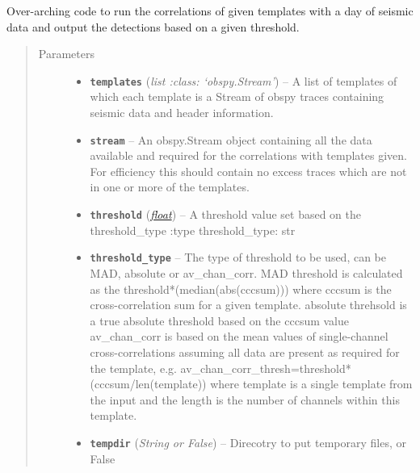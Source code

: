 \documentclass[a4paper,10pt,english]{sphinxmanual}
\begin{document}
\begin{fulllineitems}
\label{core:match_filter.match_filter}
Over-arching code to run the correlations of given templates with a day of
seismic data and output the detections based on a given threshold.
\begin{quote}\begin{description}
\item[{Parameters}] \leavevmode\begin{itemize}
\item {} 
\textbf{\texttt{templates}} (\emph{list :class: `obspy.Stream'}) -- A list of templates of which each template is a Stream of    obspy traces containing seismic data and header information.

\item {} 
\textbf{\texttt{stream}} -- An obspy.Stream object containing all the data available and    required for the correlations with templates given.  For efficiency this    should contain no excess traces which are not in one or more of the    templates.

\item {} 
\textbf{\texttt{threshold}} (\href{https://docs.python.org/library/functions.html\#float}{\emph{float}}) -- A threshold value set based on the threshold\_type    :type threshold\_type: str

\item {} 
\textbf{\texttt{threshold\_type}} -- The type of threshold to be used, can be MAD,    absolute or av\_chan\_corr.    MAD threshold is calculated as the    threshold*(median(abs(cccsum))) where cccsum is the cross-correlation sum    for a given template.    absolute threhsold is a true absolute threshold based on the cccsum value    av\_chan\_corr is based on the mean values of single-channel    cross-correlations assuming all data are present as required for the    template, e.g. av\_chan\_corr\_thresh=threshold*(cccsum/len(template)) where    template is a single template from the input and the length is the number    of channels within this template.

\item {} 
\textbf{\texttt{tempdir}} (\emph{String or False}) -- Direcotry to put temporary files, or False

\end{itemize}


\end{description}
\end{quote}
\end{fulllineitems}
\end{document}
